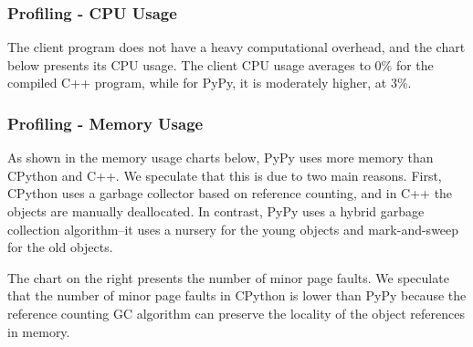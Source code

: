 \subsubsection{Profiling - CPU Usage}
The client program does not have a heavy computational overhead, and the chart below presents its CPU usage. The client CPU usage averages to 0\% for the compiled C++ program, while for PyPy, it is moderately higher, at 3\%.

\begin{figure}[H]
    \centering
\end{figure}

\subsubsection{Profiling - Memory Usage}
As shown in the memory usage charts below, PyPy uses more memory than CPython and C++. We speculate that this is due to two main reasons. First, CPython uses a garbage collector based on reference counting, and in C++ the objects are manually deallocated. In contrast, PyPy uses a hybrid garbage collection algorithm--it uses a nursery for the young objects and mark-and-sweep for the old objects.

The chart on the right presents the number of minor page faults. We speculate that the number of minor page faults in CPython is lower than PyPy because the reference counting GC algorithm can preserve the locality of the object references in memory.

\begin{figure}[H]
\end{figure}
